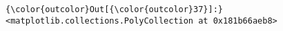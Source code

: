 \documentclass[11pt]{article}
\begin{document}
\begin{Verbatim}[commandchars=\\\{\}]
{\color{outcolor}Out[{\color{outcolor}37}]:} <matplotlib.collections.PolyCollection at 0x181b66aeb8>
\end{Verbatim}
            
    \begin{center}
    \end{center}
    { \hspace*{\fill} \\}
    

    
    
    
    
\end{document}
